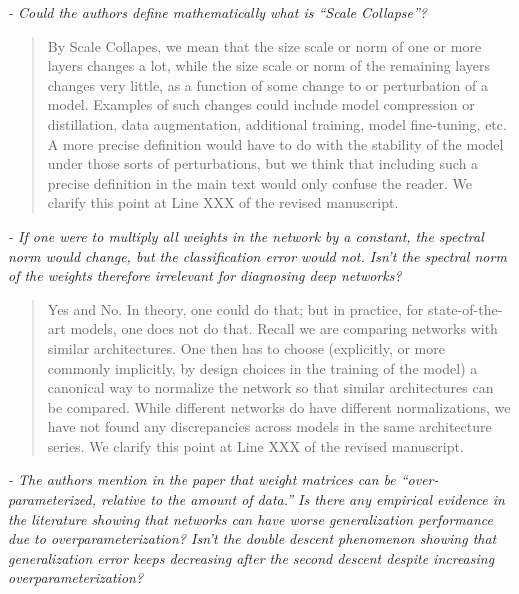 \documentclass[11pt]{article}
\begin{document}
\noindent
\emph{%
- Could the authors define mathematically what is ``Scale Collapse''?
}

\begin{quote}
By Scale Collapes, we mean that the size scale or norm of one or more layers changes a lot, while the size scale or norm of the remaining layers changes very little, as a function of some change to or perturbation of a model.  
Examples of such changes could include model compression or distillation, data augmentation, additional training, model fine-tuning, etc.
A more precise definition would have to do with the stability of the model under those sorts of perturbations, but we think that including such a precise definition in the main text would only confuse the reader.
We clarify this point at Line XXX of the revised manuscript.
\end{quote}

\noindent
\emph{%
- If one were to multiply all weights in the network by a constant, the spectral norm would change, but the classification error would not. Isn't the spectral norm of the weights therefore irrelevant for diagnosing deep networks?
}

\begin{quote}
Yes and No.  
In theory, one could do that; but in practice, for state-of-the-art models, one does not do that.
Recall we are comparing networks with similar architectures.
One then has to choose (explicitly, or more commonly implicitly, by design choices in the training of the model) a canonical way to normalize the network so that similar architectures can be compared.
While different networks do have different normalizations, we have not found any discrepancies across 
models in the same architecture series.
We clarify this point at Line XXX of the revised manuscript.
\end{quote}

\noindent
\emph{%
- The authors mention in the paper that weight matrices can be ``over-parameterized, relative to the amount of data.'' Is there any empirical evidence in the literature showing that networks can have worse generalization performance due to overparameterization? Isn't the double descent phenomenon showing that generalization error keeps decreasing after the second descent despite increasing overparameterization?
}
\end{document}
